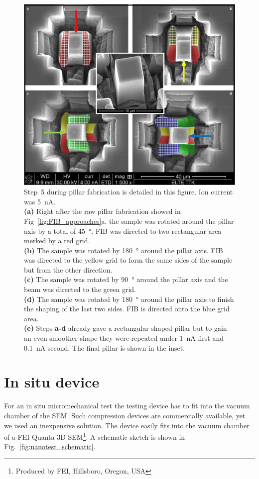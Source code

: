 \begin{figure}[htbp!] 
\centering    
\includegraphics[width=1\textwidth]{Micron-Scale_Deformation}
\caption[Final pillar fabrication details]{Step~5 during pillar fabrication is detailed in this figure. Ion current was \SI{5}{nA}.\\
\textbf{(a)} Right after the raw pillar fabrication showed in Fig~\ref{fig:FIB_approaches}a. the sample was rotated around the pillar axis by a total of \SI{45}{\degree}. FIB was directed to two rectangular area merked by a red grid.\\
\textbf{(b)} The sample was rotated by \SI{180}{\degree} around the pillar axis. FIB was directed to the yellow grid to form the same sides of the sample but from the other direction.\\
\textbf{(c)} The sample was rotated by \SI{90}{\degree} around the pillar axis and the beam was directed to the green grid.\\
\textbf{(d)} The sample was rotated by \SI{180}{\degree} around the pillar axis to finish the shaping of the last two sides. FIB is directed onto the blue grid area.\\
\textbf{(e)} Steps \textbf{a-d} already gave a rectangular shaped pillar but to gain an even smoother shape they were repeated under \SI{1}{nA} first and \SI{0.1}{nA} second. The final pillar is shown in the inset.}
\label{fig:FIB_sides}
\end{figure}


\section{In situ device}
For an in situ micromechanical test the testing device has to fit into the vacuum chamber of the SEM. Such compression devices are commercially available, yet we used an inexpensive solution. The device easily fits into the vacuum chamber of a FEI Quanta 3D SEM\footnote{Produced by FEI, Hillsboro, Oregon, USA}. A schematic sketch is shown in Fig.~\ref{fig:nanotest_schematic}.

